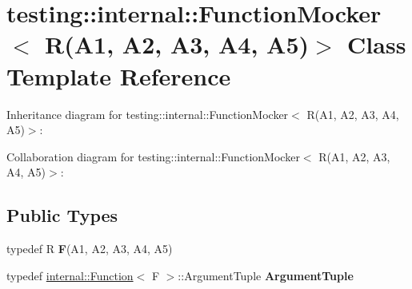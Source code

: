 \hypertarget{classtesting_1_1internal_1_1FunctionMocker_3_01R_07A1_00_01A2_00_01A3_00_01A4_00_01A5_08_4}{}\section{testing\+:\+:internal\+:\+:Function\+Mocker$<$ R(A1, A2, A3, A4, A5)$>$ Class Template Reference}
\label{classtesting_1_1internal_1_1FunctionMocker_3_01R_07A1_00_01A2_00_01A3_00_01A4_00_01A5_08_4}


Inheritance diagram for testing\+:\+:internal\+:\+:Function\+Mocker$<$ R(A1, A2, A3, A4, A5)$>$\+:


Collaboration diagram for testing\+:\+:internal\+:\+:Function\+Mocker$<$ R(A1, A2, A3, A4, A5)$>$\+:
\subsection*{Public Types}
\begin{DoxyCompactItemize}
\item 
\mbox{\label{classtesting_1_1internal_1_1FunctionMocker_3_01R_07A1_00_01A2_00_01A3_00_01A4_00_01A5_08_4_a26144c33c64b0af26a1d0c43806a0370}} 
typedef R {\bfseries F}(A1, A2, A3, A4, A5)
\item 
\mbox{\label{classtesting_1_1internal_1_1FunctionMocker_3_01R_07A1_00_01A2_00_01A3_00_01A4_00_01A5_08_4_ac82403b3f3e4e65797bb633ade91a43e}} 
typedef \hyperlink{structtesting_1_1internal_1_1Function}{internal\+::\+Function}$<$ F $>$\+::Argument\+Tuple {\bfseries Argument\+Tuple}
\end{DoxyCompactItemize}
